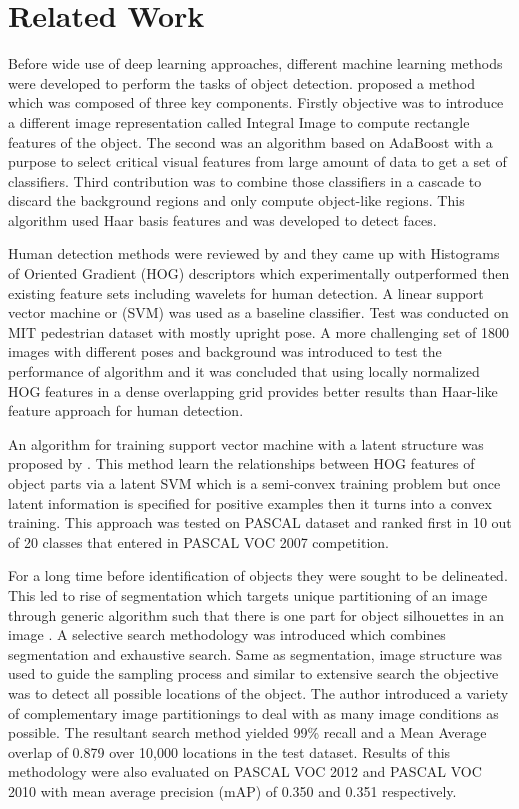 \documentclass[11pt]{article}
\begin{document}
\section{Related Work}
Before wide use of deep learning approaches, different machine learning methods were developed to perform the tasks of object detection. \cite{viola2001rapid} proposed a method which was composed of three key components. Firstly objective was to introduce a different image representation called Integral Image to compute rectangle features of the object. The second was an algorithm based on AdaBoost with a purpose to select critical visual features from large amount of data to get a set of classifiers. Third contribution was to combine those classifiers in a cascade to discard the background regions and only compute object-like regions. This algorithm used Haar basis features and was developed to detect faces.

Human detection methods were reviewed by \cite{dalal2005histograms} and they came up with Histograms of Oriented Gradient (HOG) descriptors which experimentally outperformed then existing feature sets including wavelets for human detection. A linear support vector machine or (SVM) was used as a baseline classifier. Test was conducted on MIT pedestrian dataset with mostly upright pose. A more challenging set of 1800 images with different poses and background was introduced to test the performance of algorithm and it was concluded that using locally normalized HOG features in a dense overlapping grid provides better results than Haar-like feature approach for human detection.

An algorithm for training support vector machine with a latent structure was proposed by \cite{felzenszwalb2008discriminatively}. This method learn the relationships between HOG features of object parts via a latent SVM which is a semi-convex training problem but once latent information is specified for positive examples then it turns into a convex training. This approach was tested on PASCAL dataset and ranked first in 10 out of 20 classes that entered in PASCAL VOC 2007 competition.

For a long time before identification of objects they were sought to be delineated. This led to rise of segmentation which targets unique partitioning of an image through generic algorithm such that there is one part for object silhouettes in an image \cite{uijlings2013selective}. A selective search methodology was introduced which combines segmentation and exhaustive search. Same as segmentation, image structure was used to guide the sampling process and similar to extensive search the objective was to detect all possible locations of the object. The author introduced a variety of complementary image partitionings to deal with as many image conditions as possible. The resultant search method yielded 99\% recall and a Mean Average overlap of 0.879 over 10,000 locations in the test dataset. Results of this methodology were also evaluated on PASCAL VOC 2012 and PASCAL VOC 2010 with mean average precision (mAP) of 0.350 and 0.351 respectively.
\end{document}

